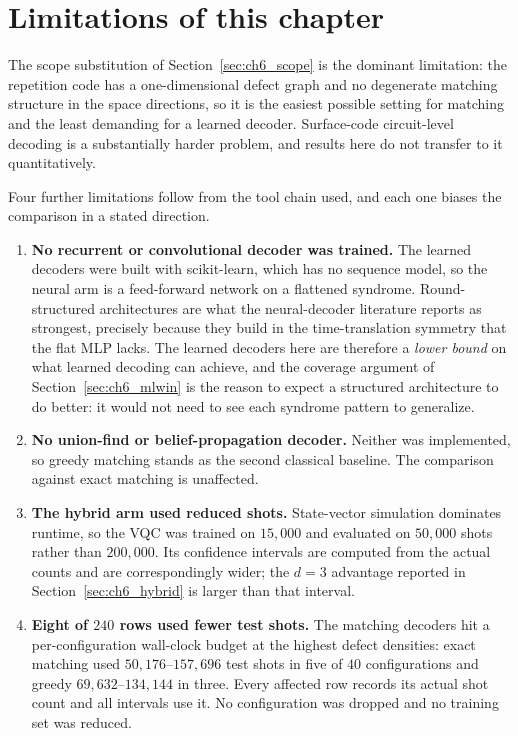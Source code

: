 \documentclass[Thesis.tex]{subfiles}
\begin{document}
\section{Limitations of this chapter}\label{sec:ch6_limits}

The scope substitution of Section~\ref{sec:ch6_scope} is the dominant limitation:
the repetition code has a one-dimensional defect graph and no degenerate matching
structure in the space directions, so it is the easiest possible setting for
matching and the least demanding for a learned decoder. Surface-code circuit-level
decoding is a substantially harder problem, and results here do not transfer to it
quantitatively.

Four further limitations follow from the tool chain used, and each one biases the
comparison in a stated direction.

\begin{enumerate}
    \item \textbf{No recurrent or convolutional decoder was trained.} The learned
    decoders were built with scikit-learn, which has no sequence model, so the neural
    arm is a feed-forward network on a flattened syndrome. Round-structured architectures are
    what the neural-decoder literature reports as strongest, precisely because they
    build in the time-translation symmetry that the flat MLP lacks. The learned
    decoders here are therefore a \emph{lower bound} on what learned decoding can
    achieve, and the coverage argument of Section~\ref{sec:ch6_mlwin} is the reason
    to expect a structured architecture to do better: it would not need to see each
    syndrome pattern to generalize.

    \item \textbf{No union-find or belief-propagation decoder.} Neither was
    implemented, so greedy matching stands as the second classical baseline. The comparison against exact
    matching is unaffected.

    \item \textbf{The hybrid arm used reduced shots.} State-vector simulation
    dominates runtime, so the VQC was trained on $15{,}000$ and evaluated on
    $50{,}000$ shots rather than $200{,}000$. Its confidence intervals are computed
    from the actual counts and are correspondingly wider; the $d = 3$ advantage
    reported in Section~\ref{sec:ch6_hybrid} is larger than that interval.

    \item \textbf{Eight of $240$ rows used fewer test shots.} The matching decoders
    hit a per-configuration wall-clock budget at the highest defect densities:
    exact matching used $50{,}176$--$157{,}696$ test shots in five of $40$
    configurations and greedy $69{,}632$--$134{,}144$ in three. Every affected row
    records its actual shot count and all intervals use it. No configuration was
    dropped and no training set was reduced.
\end{enumerate}
\end{document}
